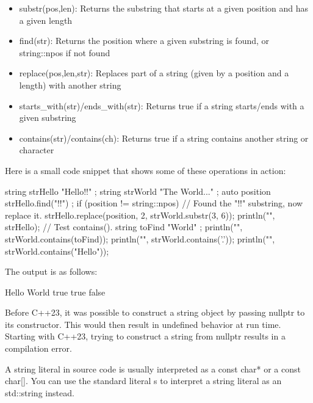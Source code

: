 \begin{itemize}
\item
substr(pos,len): Returns the substring that starts at a given position and has a given length

\item
find(str): Returns the position where a given substring is found, or string::npos if not found

\item
replace(pos,len,str): Replaces part of a string (given by a position and a length) with another string

\item
starts\_with(str)/ends\_with(str): Returns true if a string starts/ends with a given substring

\item
contains(str)/contains(ch): Returns true if a string contains another string or character
\end{itemize}

Here is a small code snippet that shows some of these operations in action:

\begin{cpp}
string strHello { "Hello!!" };
string strWorld { "The World..." };
auto position { strHello.find("!!") };
if (position != string::npos) {
    // Found the "!!" substring, now replace it.
    strHello.replace(position, 2, strWorld.substr(3, 6));
}
println("{}", strHello);
// Test contains().
string toFind { "World" };
println("{}", strWorld.contains(toFind));
println("{}", strWorld.contains('.'));
println("{}", strWorld.contains("Hello"));
\end{cpp}

The output is as follows:

\begin{shell}
Hello World
true
true
false
\end{shell}


Before C++23, it was possible to construct a string object by passing nullptr to its constructor. This would then result in undefined behavior at run time. Starting with C++23, trying to construct a string from nullptr results in a compilation error.


A string literal in source code is usually interpreted as a const char* or a const char[]. You can use the standard literal s to interpret a string literal as an std::string instead.

